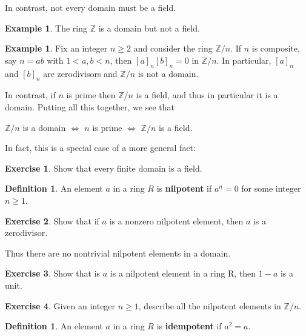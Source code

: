 \documentclass[12pt]{report}
\numberwithin{equation}{section}
\numberwithin{theorem}{chapter}
\theoremstyle{definition}
\newtheorem{definition}[theorem]{Definition}
\newtheorem{example}[theorem]{Example}
\newtheorem{exercise}{Exercise}
\newtheorem*{basic properties}{Basic Properties}
\newtheorem*{Important Remark}{Important Remark}
\begin{document}
In contrast, not every domain must be a field.


\begin{example}
The ring $\mathbb{Z}$ is a domain but not a field. 
\end{example}
 
\begin{example}
Fix an integer $n \geqslant 2$ and consider the ring $\mathbb{Z}/n$. If $n$ is composite, say $n = ab$ with $1 < a, b < n$, then $[a]_n[b]_n = 0$ in $\mathbb{Z}/n$. In particular, $[a]_n$ and $[b]_n$ are zerodivisors and $\mathbb{Z}/n$ is not a domain.

In contrast, if $n$ is prime then $\mathbb{Z}/n$ is a field, and thus in particular it is a domain. Putting all this together, we see that 

\begin{center}
	$\mathbb{Z}/n$ is a domain $\iff$ $n$ is prime $\iff$ $\mathbb{Z}/n$ is a field.
\end{center}
\end{example}


In fact, this is a special case of a more general fact:

\begin{exercise}
	Show that every finite domain is a field.
\end{exercise}


\begin{definition}
An element $a$ in a ring $R$ is {\bf nilpotent} if $a^n = 0$ for some integer $n \geqslant 1$. 
\end{definition}

\begin{exercise}
	Show that if $a$ is a nonzero nilpotent element, then $a$ is a zerodivisor.
\end{exercise}

Thus there are no nontrivial nilpotent elements in a domain.

\begin{exercise}\label{1-nilpotent is a unit}
Show that is $a$ is a nilpotent element in a ring R, then $1-a$ is a unit.
\end{exercise}

\begin{exercise}
	Given an integer $n \geqslant 1$, describe all the nilpotent elements in $\mathbb{Z}/n$.
\end{exercise}




\begin{definition}
An element $a$ in a ring $R$ is {\bf idempotent} if $a^2 = a$.
\end{definition}
\end{document}

